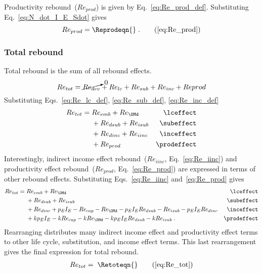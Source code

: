 \subsubsection{\Prodeffect{}} 
\label{sec:Re_prod}

Productivity rebound~($Re_{prod}$) is given by Eq.~\ref{eq:Re_prod_def}.
Substituting Eq.~\ref{eq:N_dot_I_E_Sdot} gives
%
\begin{equation}
  Re_{prod} = \Reprodeqn{} \; . \tag{\ref{eq:Re_prod}}
\end{equation}


\subsubsection{Total rebound} 
\label{sec:total_rebound}

Total rebound is the sum of all rebound effects.
%
\begin{equation}
  Re_{tot} = \cancelto{0}{Re_{dev}} + Re_{lc} + Re_{sub} + Re_{inc} + Re{prod}
\end{equation}
%
Substituting Eqs.~\ref{eq:Re_lc_def}, \ref{eq:Re_sub_def}, \ref{eq:Re_inc_def}
%
\begin{align}
  Re_{tot} = \; &Re_{emb} + Re_{\OMd}      & \mathrm{\lceffect}   \nonumber \\
                &+ Re_{dsub} + Re_{isub}   & \mathrm{\subeffect}  \nonumber \\
                &+ Re_{dinc} + Re_{iinc}   & \mathrm{\inceffect}  \nonumber \\
                &+ Re_{prod}               & \mathrm{\prodeffect}
\end{align}
%
Interestingly, 
indirect income effect rebound~($Re_{iinc}$, Eq.~\ref{eq:Re_iinc}) and
productivity effect rebound~($Re_{prod}$, Eq.~\ref{eq:Re_prod})
are expressed in terms of other rebound effects.
Substituting Eqs.~\ref{eq:Re_iinc} and~\ref{eq:Re_prod} gives
%
\begin{align}
  Re_{tot} = \; &Re_{emb} + Re_{\OMd}      & \mathrm{\lceffect}                             \nonumber \\
                &+ Re_{dsub} + Re_{isub}   & \mathrm{\subeffect}                            \nonumber \\
                &+ Re_{dinc} + p_E I_E - Re_{cap} - Re_{\OMd} - p_E I_E Re_{dsub} 
                             - Re_{isub} - p_E I_E Re_{dinc}   & \mathrm{\inceffect}        \nonumber \\
                &+ k p_E I_E - k Re_{cap} - k Re_{\OMd} - k p_E I_E Re_{dsub} - k Re_{isub} \; .  & \mathrm{\prodeffect}
\end{align}
%
Rearranging distributes many indirect income effect and productivity effect terms 
to other life cycle, substitution, and income effect terms.
This last rearrangement gives the final expression for total rebound.
%
\begin{align}
  Re_{tot} = \; \Retoteqn{} \tag{\ref{eq:Re_tot}}
\end{align}

